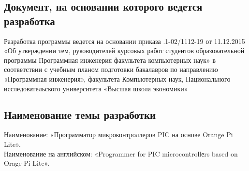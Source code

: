 \subsection{Документ, на основании которого ведется разработка}
Разработка программы ведется на основании приказа 
.1-02/1112-19 от 11.12.2015 
«Об  утверждении  тем,  руководителей  курсовых  работ  студентов
образовательной  программы  Программная  инженерия 
факультета 
компьютерных наук» в соответствии с учебным планом подготовки бакалавров по направлению «Программная инженерия», факультета Компьютерных наук,
Национального исследовательского университета «Высшая школа экономики» 


\subsection{Наименование темы разработки}
Наименование: «Программатор микроконтроллеров PIC на основе Orange Pi Lite». \\
Наименование на английском: «Programmer for PIC microcontrollеrs based on Orage Pi Lite». \\
